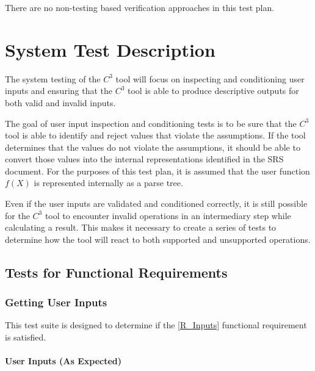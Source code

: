 \documentclass[12pt, titlepage]{article}
\newcommand{\prognameAbbrv}{$C^{3}$}
\begin{document}
There are no non-testing based verification approaches in this test plan.

\section{System Test Description}
The system testing of the \prognameAbbrv{} tool will focus on inspecting and 
conditioning user inputs and ensuring that the \prognameAbbrv{} tool is able to 
produce descriptive outputs for both valid and invalid inputs. 

The goal of user input inspection and conditioning tests is to be sure that the 
\prognameAbbrv{} tool is able to identify and reject values that violate the 
assumptions. If the tool determines that the values do not violate the 
assumptions, it should be able to convert those values into the internal 
representations identified in the SRS document. For the purposes of this test 
plan, it is assumed that the user function $f(X)$ is represented internally as 
a parse tree.

Even if the user inputs are validated and conditioned correctly, it is still 
possible for the \prognameAbbrv{} tool to encounter invalid operations in an 
intermediary step while calculating a result. This makes it necessary to create 
a series of tests to determine how the tool will react to both supported and 
unsupported operations.
	
\subsection{Tests for Functional Requirements}
\label{testplan_functional}

\subsubsection{Getting User Inputs}
This test suite is designed to determine if the \ref{R_Inputs} functional 
requirement is satisfied.

\paragraph{User Inputs (As Expected)}
\end{document}
